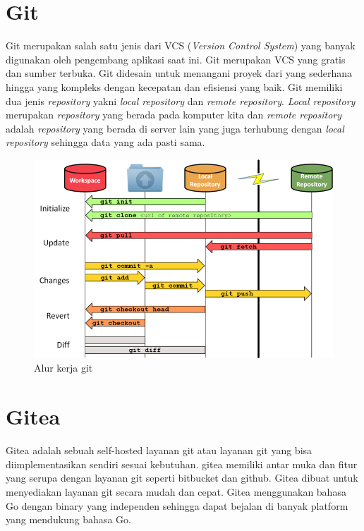        	\section{Git}
       		Git merupakan salah satu jenis dari VCS (\textit{Version Control System}) yang banyak digunakan oleh pengembang aplikasi saat ini. Git merupakan VCS yang gratis dan sumber terbuka. Git didesain untuk menangani proyek dari yang sederhana hingga yang kompleks dengan kecepatan dan efisiensi yang baik\cite{git_about}. Git memiliki dua jenis \textit{repository} yakni \textit{local repository} dan \textit{remote repository}. \textit{Local repository} merupakan \textit{repository} yang berada pada komputer kita dan \textit{remote repository} adalah \textit{repository} yang berada di server lain yang juga terhubung dengan \textit{local repository} sehingga data yang ada pasti sama.
       		
       			\begin{figure}[H]
       			\centering
       			\includegraphics[width=\textwidth]{Images/C-2/Git_workflow.png}
       			\caption{Alur kerja git \cite{git_workflow} }
       			\label{GitWorkflow}
       			\end{figure}
       		
   		\section{Gitea}
   			Gitea adalah sebuah self-hosted layanan git atau layanan git  yang bisa diimplementasikan sendiri sesuai kebutuhan. gitea memiliki antar muka dan fitur yang serupa dengan layanan git seperti bitbucket dan github. Gitea dibuat untuk menyediakan layanan git secara mudah dan cepat. Gitea menggunakan bahasa Go dengan binary yang independen sehingga dapat bejalan di banyak platform yang mendukung bahasa Go.
       		
        	
        

